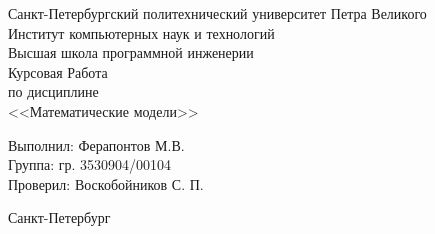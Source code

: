 \begin{titlepage}	%

	\begin{center}		%

		\large Санкт-Петербургский политехнический университет Петра Великого\\
		\large Институт компьютерных наук и технологий\\
		\large Высшая школа программной инженерии \\[6cm]

    \huge Курсовая Работа\\[0.5cm] %
		\large по дисциплине\\[0.1cm]
		\large <<Математические модели>>

	\end{center}

		\noindent\large Выполнил: \hfill \large Ферапонтов М.В.\\
		\noindent\large Группа: \hfill \large гр. 3530904/00104\\

		\noindent\large Проверил: \hfill \large Воскобойников С. П.

	\vfill %

	\begin{center}
	\large Санкт-Петербург\\
	\large \the\year %
	\end{center} %

\end{titlepage} %

\vfill %
